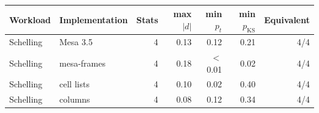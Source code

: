 \begin{tabular}{llrrrrr}
\toprule
Workload & Implementation & Stats & max $|d|$ & min $p_{t}$ & min $p_{\mathrm{KS}}$ & Equivalent \\
\midrule
Schelling & Mesa 3.5 & 4 & 0.13 & 0.12 & 0.21 & 4/4 \\
Schelling & mesa-frames & 4 & 0.18 & $<$0.01 & 0.02 & 4/4 \\
Schelling & cell lists & 4 & 0.10 & 0.02 & 0.40 & 4/4 \\
Schelling & columns & 4 & 0.08 & 0.12 & 0.34 & 4/4 \\
\bottomrule
\end{tabular}

